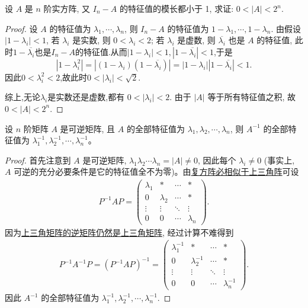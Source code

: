 \documentclass[../../main.tex]{subfiles}%
\begin{document}
\begin{example}
设 \( A \) 是 \( n \) 阶实方阵, 又 \( I_n - A \) 的特征值的模长都小于 1, 求证: \( 0 < |A| < 2^n \).
\end{example}
\begin{proof}

设 \( A \) 的特征值为 \( \lambda_1, \cdots, \lambda_n \), 则 \( I_n - A \) 的特征值为 \( 1 - \lambda_1, \cdots, 1 - \lambda_n \).
由假设 \( |1 - \lambda_i| < 1 \), 若 \( \lambda_i \) 是实数, 则 \( 0 < \lambda_i < 2 \); 若 \( \lambda_i \) 是虚数, 则 \( \overline{\lambda_i} \) 也是 \( A \) 的特征值, 此时$1-\overline{\lambda_i}$也是$I_n-A$的特征值.从而$|1-\lambda_i|<1,|1-\overline{\lambda_i}|<1$,于是
\[|1-\lambda_i^2|=|(1-\lambda_i)(1-\overline{\lambda_i})|=|1-\lambda_i||1-\overline{\lambda_i}|<1.\]
因此$0<\lambda_i^2<2$,故此时$0<|\lambda_i|<\sqrt{2}$.

综上,无论$\lambda_i$是实数还是虚数,都有 \( 0 < |\lambda_i| < 2 \). 由于 \( |A| \) 等于所有特征值之积, 故 \( 0 < |A| < 2^n \).

\end{proof}

\begin{proposition}[逆矩阵的特征值]\label{proposition:逆矩阵的特征值}
设 $n$ 阶矩阵 $A$ 是可逆矩阵, 且 $A$ 的全部特征值为 $\lambda_1, \lambda_2, \cdots, \lambda_n$, 则 $A^{-1}$ 的全部特征值为 $\lambda_1^{-1}, \lambda_2^{-1}, \cdots, \lambda_n^{-1}$。
\end{proposition}
\begin{proof}

首先注意到 $A$ 是可逆矩阵, $\lambda_1 \lambda_2 \cdots \lambda_n = |A| \neq 0$, 因此每个 $\lambda_i \neq 0$ (事实上, $A$ 可逆的充分必要条件是它的特征值全不为零)。由\hyperref[theorem:复方阵必相似于上三角阵]{复方阵必相似于上三角阵}可设
\begin{align*}
P^{-1}AP = \begin{pmatrix}
\lambda_1 & * & \cdots & * \\
0 & \lambda_2 & \cdots & * \\
\vdots & \vdots & \ddots & \vdots \\
0 & 0 & \cdots & \lambda_n
\end{pmatrix}.
\end{align*}
因为\hyperref[proposition:上三角阵性质]{上三角矩阵的逆矩阵仍然是上三角矩阵}, 经过计算不难得到
\begin{align*}
P^{-1}A^{-1}P = (P^{-1}AP)^{-1} 
= \begin{pmatrix}
\lambda_1^{-1} & * & \cdots & * \\
0 & \lambda_2^{-1} & \cdots & * \\
\vdots & \vdots & \ddots & \vdots \\
0 & 0 & \cdots & \lambda_n^{-1}
\end{pmatrix}.
\end{align*}
因此 $A^{-1}$ 的全部特征值为 $\lambda_1^{-1}, \lambda_2^{-1}, \cdots, \lambda_n^{-1}$.

\end{proof}
\end{document}
